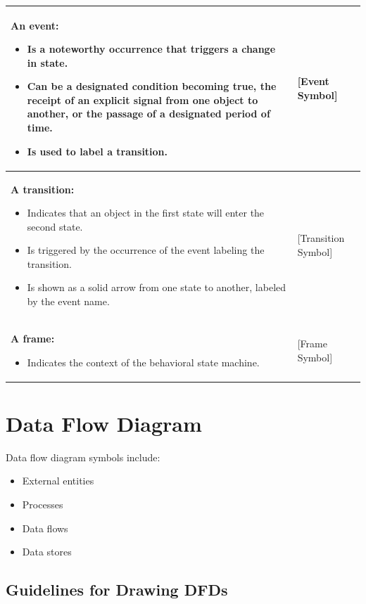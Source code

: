 \documentclass[12pt,a4paper]{report}
\begin{document}
\begin{longtable}{|p{8cm}|p{4cm}|}
\textbf{An event:} \newline
\begin{itemize}
    \item Is a noteworthy occurrence that triggers a change in state.
    \item Can be a designated condition becoming true, the receipt of an explicit signal from one object to another, or the passage of a designated period of time.
    \item Is used to label a transition.
\end{itemize} & [Event Symbol] \\
\hline

\textbf{A transition:} \newline
\begin{itemize}
    \item Indicates that an object in the first state will enter the second state.
    \item Is triggered by the occurrence of the event labeling the transition.
    \item Is shown as a solid arrow from one state to another, labeled by the event name.
\end{itemize} & [Transition Symbol] \\
\hline

\textbf{A frame:} \newline
\begin{itemize}
    \item Indicates the context of the behavioral state machine.
\end{itemize} & [Frame Symbol] \\
\hline

\end{longtable}

\section{Data Flow Diagram}

Data flow diagram symbols include:
\begin{itemize}
    \item External entities
    \item Processes
    \item Data flows
    \item Data stores
\end{itemize}

\subsection*{Guidelines for Drawing DFDs}
\end{document}
